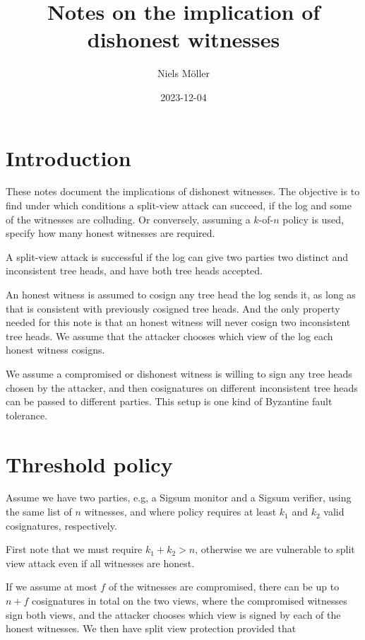 \documentclass[a4paper]{article}
\author{Niels Möller}
\title{Notes on the implication of dishonest witnesses}
\date{2023-12-04}
\begin{document}
\maketitle

\section{Introduction}

These notes document the implications of dishonest witnesses. The
objective is to find under which conditions a split-view attack can
succeed, if the log and some of the witnesses are colluding. Or
conversely, assuming a $k$-of-$n$ policy is used, specify how many
honest witnesses are required.

A split-view attack is successful if the log can give two parties two
distinct and inconsistent tree heads, and have both tree heads
accepted.

An honest witness is assumed to cosign any tree head the log sends it,
as long as that is consistent with previously cosigned tree heads. And
the only property needed for this note is that an honest witness will
never cosign two inconsistent tree heads. We assume that the attacker
chooses which view of the log each honest witness cosigns.

We assume a compromised or dishonest witness is willing to sign any
tree heads chosen by the attacker, and then cosignatures on different
inconsistent tree heads can be passed to different parties. This setup
is one kind of Byzantine fault tolerance.

\section{Threshold policy}

Assume we have two parties, e.g, a Sigsum monitor and a Sigsum
verifier, using the same list of $n$ witnesses, and where policy
requires at least $k_1$ and $k_2$ valid cosignatures, respectively.

First note that we must require $k_1 + k_2 > n$, otherwise we are
vulnerable to split view attack even if all witnesses are honest.

If we assume at most $f$ of the witnesses are compromised, there can
be up to $n + f$ cosignatures in total on the two views, where the
compromised witnesses sign both views, and the attacker chooses which
view is signed by each of the honest witnesses. We then have split
view protection provided that
\end{document}
